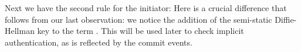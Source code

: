Next we have the second rule for the initiator:
Here is a crucial difference that follows from our last observation: we notice
the addition of the semi-static Diffie-Hellman key to the term .
This will be used later to check implicit authentication, as is reflected by the
commit events.


